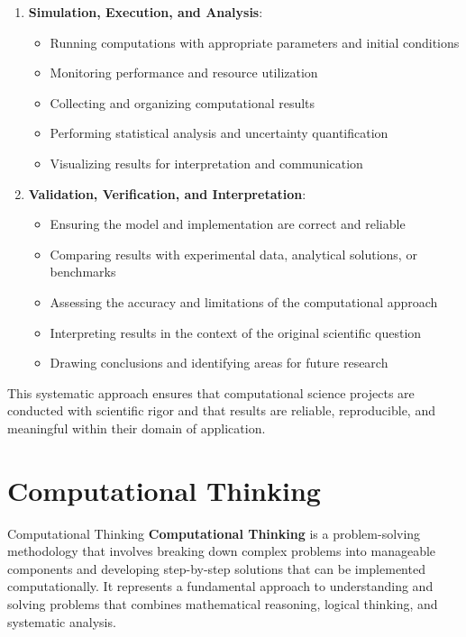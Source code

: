 \begin{enumerate}
  \item \textbf{Simulation, Execution, and Analysis}: 
  \begin{itemize}
    \item Running computations with appropriate parameters and initial conditions
    \item Monitoring performance and resource utilization
    \item Collecting and organizing computational results
    \item Performing statistical analysis and uncertainty quantification
    \item Visualizing results for interpretation and communication
  \end{itemize}
      
  \item \textbf{Validation, Verification, and Interpretation}: 
  \begin{itemize}
    \item Ensuring the model and implementation are correct and reliable
    \item Comparing results with experimental data, analytical solutions, or benchmarks
    \item Assessing the accuracy and limitations of the computational approach
    \item Interpreting results in the context of the original scientific question
    \item Drawing conclusions and identifying areas for future research
  \end{itemize}
\end{enumerate}

This systematic approach ensures that computational science projects are conducted with scientific rigor and that results are reliable, reproducible, and meaningful within their domain of application.

\section{Computational Thinking}

\begin{conceptcard}{Computational Thinking}
\textbf{Computational Thinking} is a problem-solving methodology that involves breaking down complex problems into manageable components and developing step-by-step solutions that can be implemented computationally. It represents a fundamental approach to understanding and solving problems that combines mathematical reasoning, logical thinking, and systematic analysis.
\end{conceptcard}


